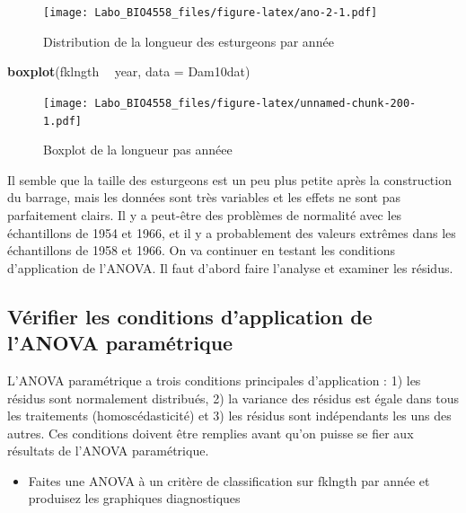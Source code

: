 \documentclass[12pt,]{book}
\newenvironment{Shaded}{\begin{snugshade}}{\end{snugshade}}
\newcommand{\DataTypeTok}[1]{\textcolor[rgb]{0.27,0.27,0.27}{#1}}
\newcommand{\KeywordTok}[1]{\textcolor[rgb]{0.27,0.27,0.27}{\textbf{#1}}}
\newcommand{\NormalTok}[1]{#1}
\newcommand{\OperatorTok}[1]{\textcolor[rgb]{0.43,0.43,0.43}{\textbf{#1}}}
\newcommand{\StringTok}[1]{\textcolor[rgb]{0.5,0.5,0.5}{#1}}
\providecommand{\tightlist}{%
  \setlength{\itemsep}{0pt}\setlength{\parskip}{0pt}}
\begin{document}
\begin{figure}
\centering
\texttt{[image: Labo\_BIO4558\_files/figure-latex/ano-2-1.pdf]}
\caption{\label{fig:ano-2}Distribution de la longueur des esturgeons par année}
\end{figure}

\begin{Shaded}
\begin{Highlighting}[]
\KeywordTok{boxplot}\NormalTok{(fklngth }\OperatorTok{~}\StringTok{ }\NormalTok{year, }\DataTypeTok{data =}\NormalTok{ Dam10dat)}
\end{Highlighting}
\end{Shaded}

\begin{figure}
\centering
\texttt{[image: Labo\_BIO4558\_files/figure-latex/unnamed-chunk-200-1.pdf]}
\caption{\label{fig:unnamed-chunk-200}Boxplot de la longueur pas annéee}
\end{figure}

Il semble que la taille des esturgeons est un peu plus petite après la construction du barrage, mais les données sont très variables et les effets ne sont pas parfaitement clairs. Il y a peut-être des problèmes de normalité avec les échantillons de 1954 et 1966, et il y a probablement des valeurs extrêmes dans les échantillons de 1958 et 1966. On va continuer en testant les conditions d'application de l'ANOVA. Il faut d'abord faire l'analyse et examiner les résidus.

\hypertarget{vuxe9rifier-les-conditions-dapplication-de-lanova-paramuxe9trique}{%
\subsection{Vérifier les conditions d'application de l'ANOVA paramétrique}\label{vuxe9rifier-les-conditions-dapplication-de-lanova-paramuxe9trique}}

L'ANOVA paramétrique a trois conditions principales d'application : 1) les résidus sont normalement distribués, 2) la variance des résidus est égale dans tous les traitements (homoscédasticité) et 3) les résidus sont indépendants les uns des autres. Ces conditions doivent être remplies avant qu'on puisse se fier aux résultats de l'ANOVA paramétrique.

\begin{itemize}
\tightlist
\item
  Faites une ANOVA à un critère de classification sur fklngth par année et produisez les graphiques diagnostiques
\end{itemize}
\end{document}
